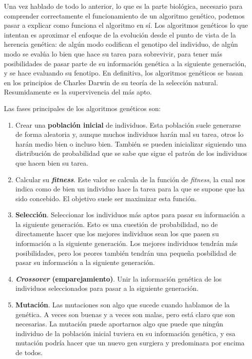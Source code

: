 Una vez hablado de todo lo anterior, lo que es la parte biológica, necesario para comprender correctamente el funcionamiento de un algoritmo genético, podemos pasar a explicar como funciona el algoritmo en sí. Los algoritmos genéticos lo que intentan es aproximar el enfoque de la evolución desde el punto de vista de la herencia genética: de algún modo codifican el genotipo del individuo, de algún modo se evalúa lo bien que hace su tarea para sobrevivir, para tener más posibilidades de pasar parte de su información genética a la siguiente generación, y se hace evaluando su fenotipo. En definitiva, los algoritmos genéticos se basan en los principios de Charles Darwin de su teoría de la selección natural. Resumidamente es la supervivencia del más apto.

Las fases principales de los algoritmos genéticos son:
\begin{enumerate}
    \item Crear una \textbf{población inicial} de individuos. Esta población suele generarse de forma aleatoria y, aunque muchos individuos harán mal su tarea, otros lo harán medio bien o incluso bien. También se pueden inicializar siguiendo una distribución de probabilidad que se sabe que sigue el patrón de los individuos que hacen bien su tarea.
    \item Calcular su \textbf{\textit{fitness}}. Este valor se calcula de la función de \textit{fitness}, la cual nos indica como de bien un individuo hace la tarea para la que se supone que ha sido concebido. El objetivo suele ser maximizar esta función.
    \item \textbf{Selección}. Seleccionar los individuos más aptos para pasar su información a la siguiente generación. Esto es una cuestión de probabilidad, no de directamente hacer que los mejores individuos sean los que pasen su información a la siguiente generación. Los mejores individuos tendrán más posibilidades, pero los peores también tendrán una pequeña posbilidad de pasar su información a la siguiente generación.
    \item \textbf{\textit{Crossover} (emparejamiento)}. Unir la información genética de los individuos seleccionados para pasar a la siguiente generación.
    \item \textbf{Mutación}. Las mutaciones son algo que sucede cuando hablamos de la genética. A veces son buenas y a veces son malas, pero está claro que son necesarias. La mutación puede aportarnos algo que puede que ningún individuo de la población inicial tuviera en su información genética, y esa mutación podría hacer que un nuevo gen surgiera y predominara por encima de todos.
    \label{enum:geneticAlgorithmSteps}
\end{enumerate}

